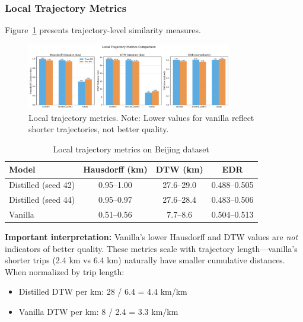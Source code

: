 \subsubsection{Local Trajectory Metrics}

Figure~\ref{fig:local-metrics} presents trajectory-level similarity measures.

\begin{figure}[h]
    \centering
    \includegraphics[width=0.8\textwidth]{assets/plots/hoser/local_metrics.pdf}
    \caption{Local trajectory metrics. Note: Lower values for vanilla reflect shorter trajectories, not better quality.}
    \label{fig:local-metrics}
\end{figure}

\begin{table}[h]
    \centering
    \caption{Local trajectory metrics on Beijing dataset}
    \label{tab:local-results}
    \small
    \begin{tabular}{lccc}
        \toprule
        \textbf{Model}      & \textbf{Hausdorff (km)} & \textbf{DTW (km)} & \textbf{EDR} \\
        \midrule
        Distilled (seed 42) & 0.95--1.00              & 27.6--29.0        & 0.488--0.505 \\
        Distilled (seed 44) & 0.95--0.97              & 27.6--28.4        & 0.483--0.506 \\
        Vanilla             & 0.51--0.56              & 7.7--8.6          & 0.504--0.513 \\
        \bottomrule
    \end{tabular}
\end{table}

\textbf{Important interpretation:} Vanilla's lower Hausdorff and DTW values are \emph{not} indicators of better quality. These metrics scale with trajectory length—vanilla's shorter trips (2.4 km vs 6.4 km) naturally have smaller cumulative distances. When normalized by trip length:

\begin{itemize}[noitemsep,topsep=0pt]
    \item Distilled DTW per km: 28 / 6.4 = 4.4 km/km
    \item Vanilla DTW per km: 8 / 2.4 = 3.3 km/km
\end{itemize}

